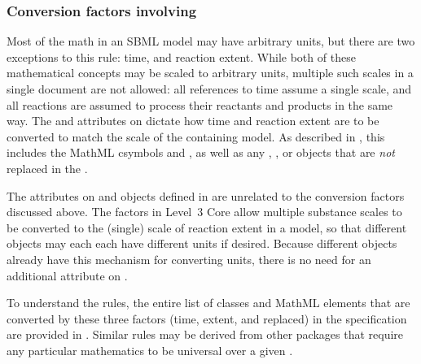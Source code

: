 \subsubsection{Conversion factors involving }

Most of the math in an SBML model may have arbitrary units, but there
are two exceptions to this rule: time, and reaction extent.  While both
of these mathematical concepts may be scaled to arbitrary units,
multiple such scales in a single document are not allowed: all
references to time assume a single scale, and all reactions are assumed
to process their reactants and products in the same way.  The
 and 
attributes on \Submodel dictate how time and reaction extent are to be
converted to match the scale of the containing model.  As described in
, this includes the MathML csymbols
 and , as well as any \Delay, \KineticLaw, or
\RateRule objects that are \emph{not} replaced in the \Submodel.

The  attributes on \Species and \Model objects
defined in \sbmlthreecore are unrelated to the conversion factors
discussed above.  The factors in Level~3 Core allow multiple substance
scales to be converted to the (single) scale of reaction extent in a
model, so that different \Species objects may each each have different
units if desired.  Because different \Species objects already have this
mechanism for converting units, there is no need for an additional
 attribute on \Submodel.

To understand the rules, the entire list of classes and MathML elements
that are converted by these three factors (time, extent, and
replaced) in the \sbmlthreecore specification are provided
in .  Similar rules may be derived from other
packages that require any particular mathematics to be universal over 
a given \Model.

\newcommand{\sprd}[2]{\raisebox{-#1pt}[0pt][(#1pt * 2) + 4pt]{#2}}
\newcommand{\persymb}{\emph{Conversion factor for referenced object}}

